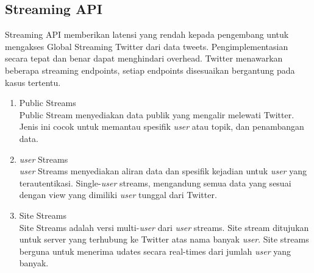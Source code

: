 \subsection{Streaming API}
Streaming API memberikan latensi yang rendah kepada pengembang untuk mengakses Global Streaming Twitter dari data tweets. Pengimplementasian secara tepat dan benar dapat menghindari overhead. Twitter menawarkan beberapa streaming endpoints, setiap endpoints disesuaikan bergantung pada kasus tertentu.
\begin{enumerate}
	\item Public Streams\\
	Public Stream menyediakan data publik yang mengalir melewati Twitter. Jenis ini cocok untuk memantau spesifik \textit{user} atau topik, dan penambangan data.
	\item \textit{user} Streams\\
	\textit{user} Streams menyediakan aliran data dan spesifik kejadian untuk \textit{user} yang terautentikasi. Single-\textit{user} streams, mengandung semua data yang sesuai dengan view yang dimiliki \textit{user} tunggal dari Twitter. 
	\item Site Streams\\
	Site Streams adalah versi multi-\textit{user} dari \textit{user} streams. Site stream ditujukan untuk server yang terhubung ke Twitter atas nama banyak \textit{user}. Site streams berguna untuk menerima udates secara real-times dari jumlah \textit{user} yang banyak. 
\end{enumerate}
